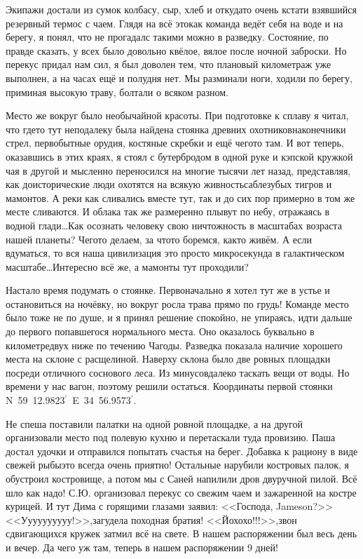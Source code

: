 Экипажи достали из сумок колбасу, сыр, хлеб и откуда\sdash то очень кстати взявшийся резервный термос с чаем. Глядя на всё это\mdash как команда ведёт себя на воде и на берегу, я понял, что не прогадал\mdash с такими можно в разведку. Состояние, по правде сказать, у всех было довольно квёлое, вялое после ночной заброски. Но перекус придал нам сил, я был доволен тем, что плановый километраж уже выполнен, а на часах ещё и полудня нет. Мы разминали ноги, ходили по берегу, приминая высокую траву, болтали о всяком разном.

Место же вокруг было необычайной красоты. При подготовке к сплаву я читал, что где\sdash то тут неподалеку была найдена стоянка древних охотников\mdash наконечники стрел, первобытные орудия, костяные скребки и ещё чего\sdash то там. И вот теперь, оказавшись в этих краях, я стоял с бутербродом в одной руке и кэпской кружкой чая в другой и мысленно переносился на многие тысячи лет назад, представляя, как доисторические люди охотятся на всякую живность\mdash саблезубых тигров и мамонтов. А реки как сливались вместе тут, так и до сих пор примерно в том же месте сливаются. И облака так же размеренно плывут по небу, отражаясь в водной глади\ldots Как осознать человеку свою ничтожность в масштабах возраста нашей планеты? Чего\sdash то делаем, за что\sdash то боремся, как\sdash то живём. А если вдуматься, то вся наша цивилизация \mdash это просто микросекунда в галактическом масштабе\ldots Интересно всё же, а мамонты тут проходили?

Настало время подумать о стоянке. Первоначально я хотел тут же в устье и остановиться на ночёвку, но вокруг росла трава прямо по грудь! Команде место было тоже не по душе, и я принял решение спокойно, не упираясь, идти дальше до первого попавшегося нормального места. Оно оказалось буквально в километре\sdash двух ниже по течению Чагоды. Разведка показала наличие хорошего места на склоне с расщелиной. Наверху склона было две ровных площадки посреди отличного соснового леса. Из минусов\mdash далеко таскать вещи от воды. Но времени у нас вагон, поэтому решили остаться. Координаты первой стоянки N~59\degree~12.9823$^\prime$~E~34\degree~56.9573$^\prime$. 

Не спеша поставили палатки на одной ровной площадке, а на другой организовали место под полевую кухню и перетаскали туда провизию. Паша достал удочки и отправился попытать счастья на берег. Добавка к рациону в виде свежей рыбы\mdash это всегда очень приятно! Остальные нарубили костровых палок, я обустроил костровище, а потом мы с Саней напилили дров двуручной пилой. Всё шло как надо! С.Ю. организовал перекус со свежим чаем и зажаренной на костре курицей. И тут Дима с горящими глазами заявил: <<Господа, Jameson?>> <<У\sdash у\sdash у\sdash у\sdash у\sdash у\sdash у\sdash у\sdash у\sdash у!>>,\mdash загудела походная братия! <<Йо\sdash хо\sdash хо!!!>>,\mdash звон сдвигающихся кружек затмил всё на свете. В нашем распоряжении был весь день и вечер. Да чего уж там, теперь в нашем распоряжении 9 дней! 

